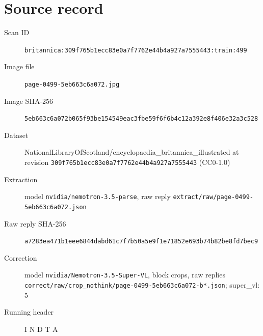 \documentclass{article}
\begin{document}
\section*{Source record}
\begin{description}
\item[Scan ID] \texttt{britannica:309f765b1ecc83e0a7f7762e44b4a927a7555443:train:499}
\item[Image file] \texttt{page-0499-5eb663c6a072.jpg}
\item[Image SHA-256] \texttt{5eb663c6a072b065f93be154549eac3fbe59f6f6b4c12a392e8f406e32a3c528}
\item[Dataset] NationalLibraryOfScotland/encyclopaedia\_britannica\_illustrated at revision \texttt{309f765b1ecc83e0a7f7762e44b4a927a7555443} (CC0-1.0)
\item[Extraction] model \texttt{nvidia/nemotron-3.5-parse}, raw reply \texttt{extract/raw/page-0499-5eb663c6a072.json}
\item[Raw reply SHA-256] \texttt{a7283ea471b1eee6844dabd61c7f7b50a5e9f1e71852e693b74b82be8fd7bec9}
\item[Correction] model \texttt{nvidia/Nemotron-3.5-Super-VL}, block crops, raw replies \texttt{correct/raw/crop\_nothink/page-0499-5eb663c6a072-b*.json}; super\_vl: 5
\item[Running header] I N D T A
\end{description}
\end{document}
